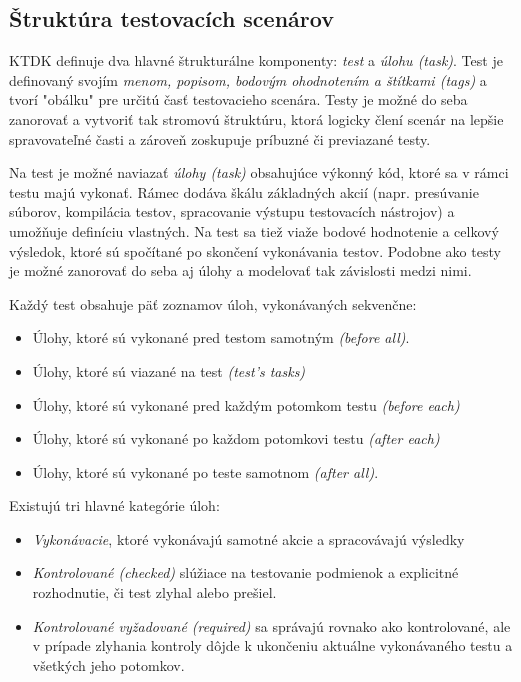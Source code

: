 \documentclass[
  digital, %
  twoside, %
  table,   %
  lof,     %
  lot,     %
]{fithesis3}
\begin{document}
\subsection{Štruktúra testovacích scenárov}
KTDK definuje dva hlavné štrukturálne komponenty: \emph{test} a \emph{úlohu (task)}. Test je definovaný svojím \emph{menom, popisom, bodovým ohodnotením a štítkami (\emph{tags})} a tvorí "obálku" pre určitú časť testovacieho scenára. Testy je možné do seba zanorovať a vytvoriť tak stromovú štruktúru, ktorá logicky člení scenár na lepšie spravovateľné časti a zároveň zoskupuje príbuzné či previazané testy. 

Na test je možné naviazať \emph{úlohy (task)} obsahujúce výkonný kód, ktoré sa v rámci testu majú vykonať. Rámec dodáva škálu základných akcií (napr. presúvanie súborov, kompilácia testov, spracovanie výstupu testovacích nástrojov) a umožňuje definíciu vlastných. Na test sa tiež viaže bodové hodnotenie a celkový výsledok, ktoré sú spočítané po skončení vykonávania testov. Podobne ako testy je možné zanorovať do seba aj úlohy a modelovať tak závislosti medzi nimi.

Každý test obsahuje päť zoznamov úloh, vykonávaných sekvenčne:
\begin{itemize}
    \item Úlohy, ktoré sú vykonané pred testom samotným \emph{(before all)}.
    \item Úlohy, ktoré sú viazané na test \emph{(test's tasks)}
    \item Úlohy, ktoré sú vykonané pred každým potomkom testu \emph{(before each)} 
    \item Úlohy, ktoré sú vykonané po každom potomkovi testu \emph{(after each)}
    \item Úlohy, ktoré sú vykonané po teste samotnom \emph{(after all)}.
\end{itemize}

Existujú tri hlavné kategórie úloh:
\begin{itemize}
    \item \emph{Vykonávacie}, ktoré vykonávajú samotné akcie a spracovávajú výsledky
    \item \emph{Kontrolované (checked)} slúžiace na testovanie podmienok a explicitné rozhodnutie, či test zlyhal alebo prešiel.
    \item \emph{Kontrolované vyžadované (required)} sa správajú rovnako ako kontrolované, ale v prípade zlyhania kontroly dôjde k ukončeniu aktuálne vykonávaného testu a všetkých jeho potomkov.
\end{itemize}
\end{document}
